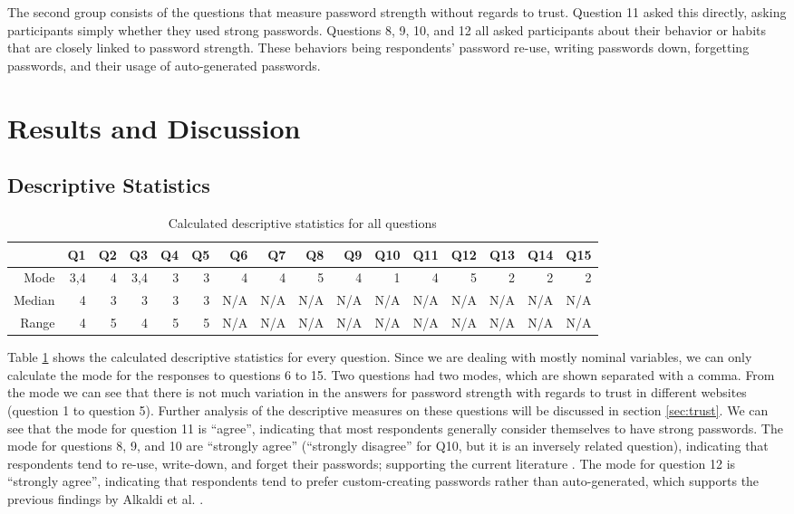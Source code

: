 \documentclass[letterpaper, 10 pt, conference]{ieeeconf}  %
\begin{document}
The second group consists of the questions that measure password strength without regards to trust. Question 11 asked this directly, asking participants simply whether they used strong passwords. Questions 8, 9, 10, and 12 all asked participants about their behavior or habits that are closely linked to password strength. These behaviors being respondents' password re-use, writing passwords down, forgetting passwords, and their usage of auto-generated passwords.

\section{Results and Discussion}\label{sec:results}

\subsection{Descriptive Statistics}

\begin{table}[h]
\caption{Calculated descriptive statistics for all questions}
\label{tab:desc}
\begin{center}
\begin{tabular}{rrrrrrrrrrrrrrrr}
\hline
      & Q1  & Q2 & Q3  & Q4 & Q5 & Q6  & Q7  & Q8  & Q9  & Q10 & Q11 & Q12 & Q13 & Q14 & Q15 \\ \hline
Mode   & 3,4 & 4  & 3,4 & 3  & 3  & 4   & 4   & 5   & 4   & 1   & 4   & 5   & 2   & 2   & 2   \\ \hline
Median & 4   & 3  & 3   & 3  & 3  & N/A & N/A & N/A & N/A & N/A & N/A & N/A & N/A & N/A & N/A \\ \hline
Range  & 4   & 5  & 4   & 5  & 5  & N/A & N/A & N/A & N/A & N/A & N/A & N/A & N/A & N/A & N/A \\ \hline
\end{tabular}
\end{center}
\end{table}

Table \ref{tab:desc} shows the calculated descriptive statistics for every question. Since we are dealing with mostly nominal variables, we can only calculate the mode for the responses to questions 6 to 15.  Two questions had two modes, which are shown separated with a comma. From the mode we can see that there is not much variation in the answers for password strength with regards to trust in different websites (question 1 to question 5). Further analysis of the descriptive measures on these questions will be discussed in section \ref{sec:trust}. We can see that the mode for question 11 is “agree”, indicating that most respondents generally consider themselves to have strong passwords. The mode for questions 8, 9, and 10 are “strongly agree” (“strongly disagree” for Q10, but it is an inversely related question), indicating that respondents tend to re-use, write-down, and forget their passwords; supporting the current literature \cite{Brown2004}. The mode for question 12 is “strongly agree”, indicating that respondents tend to prefer custom-creating passwords rather than auto-generated, which supports the previous findings by Alkaldi et al. \cite{Alkaldi2016}.
\end{document}
